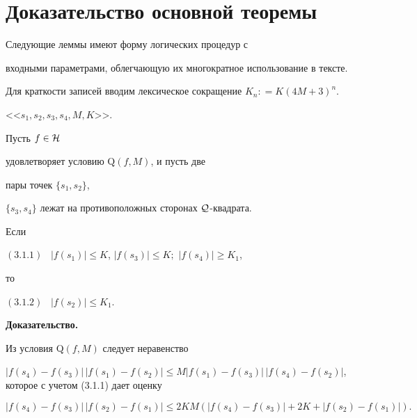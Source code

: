 \section{Доказательство основной теоремы} 





Следующие леммы имеют форму логических процедур с 


входными параметрами, облегчающую их многократное использование в тексте. 


Для краткости записей вводим лексическое сокращение $K_n : = K(4M+3)^n$.





\begin{lems}


<<$s_1, s_2, s_3, s_4, M, K$>>.




Пусть $f\in {\cal H}$ 


удовлетворяет условию $\mathrm Q(f,M)$, и пусть две 


пары точек $\{ s_1, s_2 \}$, 


$\{ s_3, s_4\} $ лежат на противоположных сторонах ${\cal Q}$-квадрата. 


Если 





$(3.1.1)$ \ $|f(s_1)|\leq K$, $|f(s_3)|\leq K;$ $|f(s_4)| \geq K_1$, 





\noindent{}то 





$(3.1.2)$ \ $|f(s_2)|\leq K_1$.


\end{lems}





{\bf Доказательство.}


Из условия Q$(f,M)$ следует неравенство 


$| f(s_4) - f(s_3)|\, |f(s_1) - f(s_2)| \leq M |f(s_1) - f(s_3)| 


\, |f(s_4) - f(s_2)|$, которое с учетом (3.1.1) дает оценку 


\begin{equation}


\label{q1}


|f(s_4) - f(s_3)|\, |f(s_2) - f(s_1)| \leq 2KM (|f(s_4) - f(s_3)| + 2K + 


|f(s_2) - f(s_1)|).


\end{equation} 


